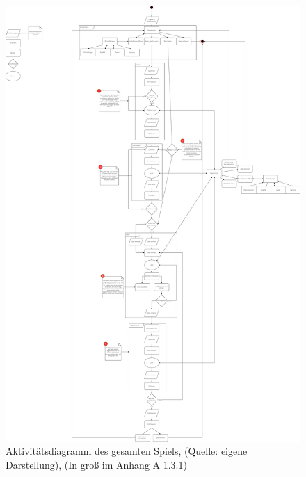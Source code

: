 \begin{figure}[p]
\centering
\includegraphics[width=1\linewidth]{content/pictures/main_loop.jpg}
\caption{Aktivitätsdiagramm des gesamten Spiels, (Quelle: eigene Darstellung), (In groß im Anhang A 1.3.1)}
\label{fig:main_loop}
\end{figure}

